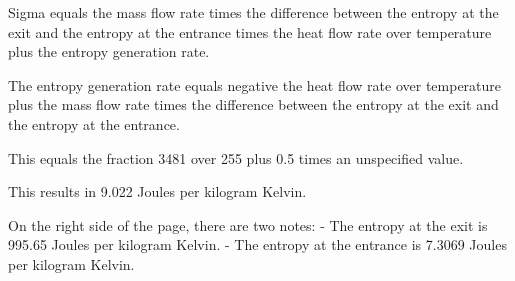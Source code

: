 Sigma equals the mass flow rate times the difference between the entropy at the exit and the entropy at the entrance times the heat flow rate over temperature plus the entropy generation rate.

The entropy generation rate equals negative the heat flow rate over temperature plus the mass flow rate times the difference between the entropy at the exit and the entropy at the entrance.

This equals the fraction 3481 over 255 plus 0.5 times an unspecified value.

This results in 9.022 Joules per kilogram Kelvin.

On the right side of the page, there are two notes:
- The entropy at the exit is 995.65 Joules per kilogram Kelvin.
- The entropy at the entrance is 7.3069 Joules per kilogram Kelvin.